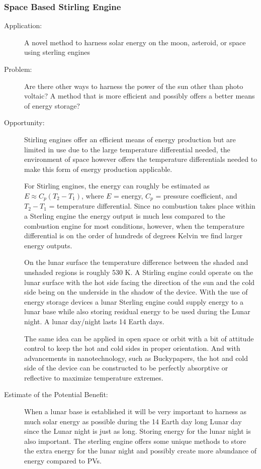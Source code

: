 \subsubsection{Space Based Stirling Engine}
\label{stirling}
\begin{description}   \item[Application:] A novel method to harness solar energy on the moon,   asteroid, or space using sterling engines
 
\item[Problem:] Are there other   ways to harness the power of the sun other than photo voltaic? A method   that is more efficient and possibly offers a better means of energy   storage?
 
\item[Opportunity:] Stirling   engines offer an efficient means of energy production but are limited  in  use due to the large temperature differential needed, the  environment  of space however offers the temperature differentials  needed to make  this form of energy production applicable. 
 
For Stirling engines, the energy   can roughly be estimated as $E \approx C_{p}(T_{2}-T_{1})$, where $E$ = energy, $C_p$ =  pressure  coefficient, and $T_2 - T_1$ = temperature differential. Since no   combustion takes place within a Sterling engine the energy output is   much less compared to the combustion engine for most conditions,   however, when the temperature differential is on the order of hundreds   of degrees Kelvin we find larger energy outputs. 
 
On the lunar surface the   temperature difference between the shaded and unshaded regions is   roughly 530 K. A Stirling engine could operate on the  lunar surface with  the hot side facing the direction of the sun and the  cold side being on  the underside in the shadow of the device. With the  use of energy  storage devices a lunar Sterling engine could supply  energy to a lunar  base while also storing residual energy to be used  during the Lunar  night. A lunar day/night lasts 14 Earth days.
 
The same idea can be applied in   open space or orbit with a bit of attitude control to keep the hot and   cold sides in proper orientation. And with advancements in  nanotechnology, such as  Buckypapers, the hot and cold side of the device  can be constructed to  be perfectly absorptive or reflective to maximize  temperature extremes.
 
\item[Estimate of the Potential   Benefit:] When a lunar base is established it will be very important to   harness as much solar energy as possible during the 14 Earth day long   Lunar day since the Lunar night is just as long. Storing energy for the   lunar night is also important. The sterling engine offers some unique   methods to store the extra energy for the lunar night and possibly   create more abundance of energy compared to \glspl{PV}.
\end{description}
 

